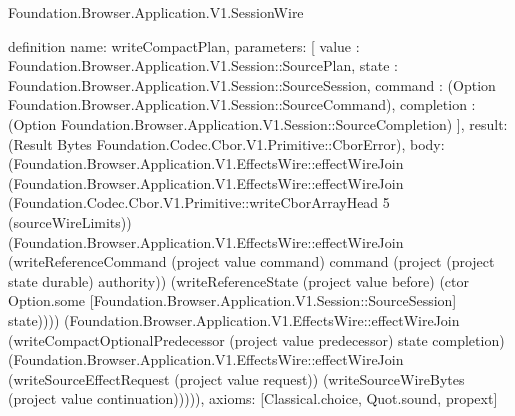\begin{lexlean}{Foundation.Browser.Application.V1.SessionWire}
\begin{semanticmodule}
definition{
  name: writeCompactPlan,
  parameters: [
    value : Foundation.Browser.Application.V1.Session::SourcePlan,
    state : Foundation.Browser.Application.V1.Session::SourceSession,
    command : (Option Foundation.Browser.Application.V1.Session::SourceCommand),
    completion : (Option Foundation.Browser.Application.V1.Session::SourceCompletion)
  ],
  result: (Result Bytes Foundation.Codec.Cbor.V1.Primitive::CborError),
  body: (Foundation.Browser.Application.V1.EffectsWire::effectWireJoin (Foundation.Browser.Application.V1.EffectsWire::effectWireJoin (Foundation.Codec.Cbor.V1.Primitive::writeCborArrayHead 5 (sourceWireLimits)) (Foundation.Browser.Application.V1.EffectsWire::effectWireJoin (writeReferenceCommand (project value command) command (project (project state durable) authority)) (writeReferenceState (project value before) (ctor Option.some [Foundation.Browser.Application.V1.Session::SourceSession] state)))) (Foundation.Browser.Application.V1.EffectsWire::effectWireJoin (writeCompactOptionalPredecessor (project value predecessor) state completion) (Foundation.Browser.Application.V1.EffectsWire::effectWireJoin (writeSourceEffectRequest (project value request)) (writeSourceWireBytes (project value continuation))))),
  axioms: [Classical.choice, Quot.sound, propext]
}


\end{semanticmodule}
\end{lexlean}
